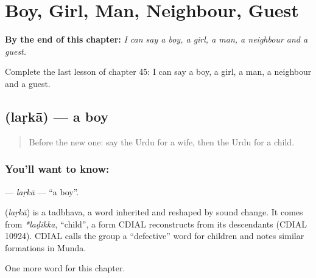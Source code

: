 
\chapter{Boy, Girl, Man, Neighbour, Guest}
\label{ch:ur-boy-girl-man-neighbour-guest}

\begin{chapteropening}
\textbf{By the end of this chapter:} \emph{I can say a boy, a girl, a man, a neighbour and a guest.}

Complete the last lesson of chapter 45: I can say a boy, a girl, a man, a neighbour and a guest.
\end{chapteropening}

\section[\texorpdfstring{\ur{لڑکا} (laṛkā)}{لڑکا (laṛkā)}]{ (laṛkā) — a boy}

\label{lesson:UR-C45-larka}



\begin{quote}
Before the new one: say the Urdu for a wife, then the Urdu for a child.
\end{quote}

\subsection*{You'll want to know: }
\textbf{} — \emph{laṛkā} — \textquotedblleft{}a boy\textquotedblright{}.

\begin{cousinweb}
\textbf{} (\emph{laṛkā}) is a tadbhava, a word inherited and reshaped by sound change. It comes from \emph{*laḍikka}, \textquotedblleft{}child\textquotedblright{}, a form CDIAL reconstructs from its descendants (CDIAL 10924). CDIAL calls the group a \textquotedblleft{}defective\textquotedblright{} word for children and notes similar formations in Munda.
\end{cousinweb}

\begin{grammarlens}[title={What you've built}]
One more word for this chapter.
\end{grammarlens}

